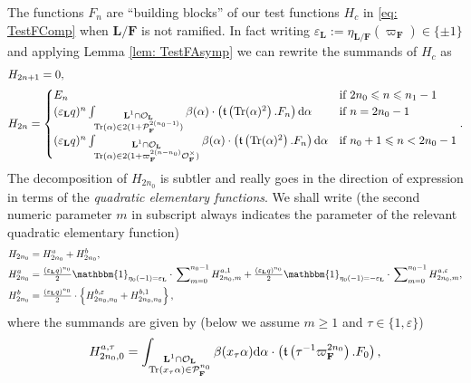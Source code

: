 \documentclass[A4]{amsart}
\def\leq{\leqslant}
\def\geq{\geqslant}
\numberwithin{equation}{section} \everymath{\displaystyle}
\newcommand{\Tr}{{\rm Tr}}
\newcommand{\id}{\mathbbm{1}}
\newcommand{\ud}{\mathrm{d}}
\newcommand{\F}{\mathbf{F}}
\newcommand{\bL}{\mathbf{L}}
\newcommand{\vO}{\mathcal{O}}
\newcommand{\vP}{\mathcal{P}}
\newcommand{\Trans}{\mathfrak{t}}
\begin{document}
	The functions $F_n$ are ``building blocks'' of our test functions $H_c$ in \eqref{eq: TestFComp} when $\bL/\F$ is not ramified. In fact writing $\varepsilon_{\bL}:=\eta_{\bL/\F}(\varpi_{\F}) \in \{ \pm 1 \}$ and applying Lemma \ref{lem: TestFAsymp} we can rewrite the summands of $H_c$ as
\begin{align}
	&H_{2n+1} = 0, \label{eq: FPTestFNR0} \\
	&H_{2n} = \begin{cases}
		E_n & \text{if } 2n_0 \leq n \leq n_1-1 \\
		(\varepsilon_{\bL}q)^n \int_{\substack{\bL^1 \cap \vO_{\bL} \\ \Tr(\alpha) \in 2(1+\vP_{\F}^{2(n_0-1)})}} \beta(\alpha) \cdot \left( \Trans \left( \Tr(\alpha)^2 \right).F_n \right) \ud \alpha & \text{if } n = 2n_0-1 \\
		(\varepsilon_{\bL}q)^n \int_{\substack{\bL^1 \cap \vO_{\bL} \\ \Tr(\alpha) \in 2(1+\varpi_{\F}^{2(n-n_0)} \vO_{\F}^{\times})}} \beta(\alpha) \cdot \left( \Trans \left( \Tr(\alpha)^2 \right).F_n \right) \ud \alpha & \text{if } n_0+1 \leq n < 2n_0-1
	\end{cases}. \label{eq: FPTestFNR1}
\end{align}
	The decomposition of $H_{2n_0}$ is subtler and really goes in the direction of expression in terms of the \emph{quadratic elementary functions}. We shall write (the second numeric parameter $m$ in subscript always indicates the parameter of the relevant quadratic elementary function)
\begin{align} 
	H_{2n_0} &= H_{2n_0}^a + H_{2n_0}^b, \nonumber \\
	H_{2n_0}^a &= \tfrac{(\varepsilon_{\bL}q)^{n_0}}{2} \id_{\eta_0(-1)=\varepsilon_{\bL}} \cdot \sideset{}{_{m=0}^{n_0-1}} \sum H_{2n_0, m}^{a,1} + \tfrac{(\varepsilon_{\bL}q)^{n_0}}{2} \id_{\eta_0(-1)=-\varepsilon_{\bL}} \cdot \sideset{}{_{m=0}^{n_0-1}} \sum H_{2n_0, m}^{a,\varepsilon}, \label{eq: FPTestFNR2} \\
	H_{2n_0}^b &= \tfrac{(\varepsilon_{\bL}q)^{n_0}}{2} \cdot \left\{ H_{2n_0,n_0}^{b,\varepsilon} + H_{2n_0,n_0}^{b,1} \right\}, \label{eq: FPTestFNR2Bis}
\end{align}
	where the summands are given by (below we assume $m \geq 1$ and $\tau \in \{ 1, \varepsilon \}$)
	$$ H_{2n_0, 0}^{a,\tau} = \int_{\substack{\bL^1 \cap \vO_{\bL} \\ \Tr(x_{\tau}\alpha) \in \vP_{\F}^{n_0}}} \beta(x_{\tau} \alpha) \ud \alpha \cdot \left( \Trans \left( \tau^{-1}\varpi_{\F}^{2n_0} \right).F_0 \right), $$
\end{document}
